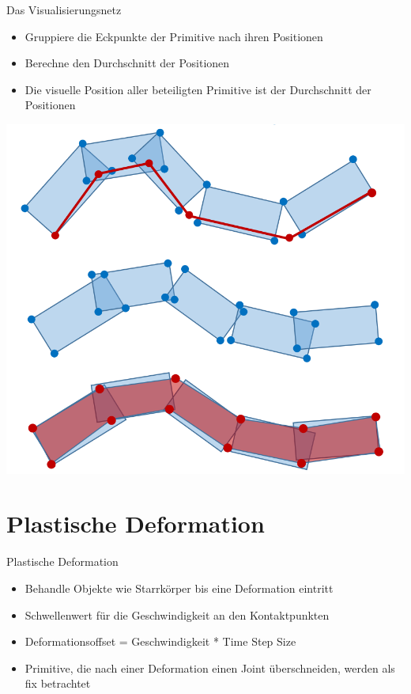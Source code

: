 \documentclass[t]{beamer}
\begin{document}
	\begin{frame}{Das Visualisierungsnetz}
		\begin{minipage}{0.5\textwidth}
			\begin{itemize}
				\item Gruppiere die Eckpunkte der Primitive nach ihren Positionen
				\item Berechne den Durchschnitt der Positionen
				\item Die visuelle Position aller beteiligten Primitive ist der Durchschnitt der Positionen
			\end{itemize}
		\end{minipage}\begin{minipage}{0.5\textwidth}
			\centering
			\includegraphics[scale = 0.25]{PhysicalMeshCreation_Step234.png}
		\end{minipage}
	\end{frame}
	
	\section{Plastische Deformation}
	\begin{frame}{Plastische Deformation}
		\begin{itemize}
			\item Behandle Objekte wie Starrkörper bis eine Deformation eintritt
			\item Schwellenwert für die Geschwindigkeit an den Kontaktpunkten
			\item Deformationsoffset = Geschwindigkeit * Time Step Size
			\item Primitive, die nach einer Deformation einen Joint überschneiden, werden als fix betrachtet
		\end{itemize}
	\end{frame}
	
\end{document}
